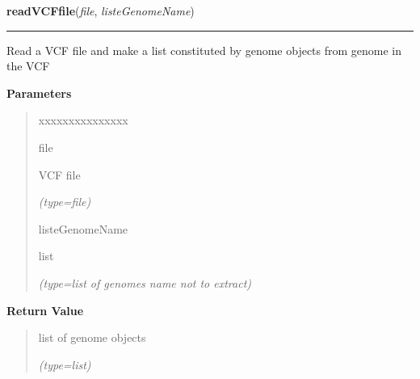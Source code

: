 \hspace{.8\funcindent}\begin{boxedminipage}{\funcwidth}

    \raggedright \textbf{readVCFfile}(\textit{file}, \textit{listeGenomeName})

    \vspace{-1.5ex}

    \rule{\textwidth}{0.5\fboxrule}
\setlength{\parskip}{2ex}
    Read a VCF file and make a list constituted by genome objects from 
    genome in the VCF

\setlength{\parskip}{1ex}
      \textbf{Parameters}
      \vspace{-1ex}

      \begin{quote}
        \begin{Ventry}{xxxxxxxxxxxxxxx}

          \item[file]

          VCF file

            {\it (type=file)}

          \item[listeGenomeName]

          list

            {\it (type=list of genomes name not to extract)}

        \end{Ventry}

      \end{quote}

      \textbf{Return Value}
    \vspace{-1ex}

      \begin{quote}
      list of genome objects

      {\it (type=list)}

      \end{quote}

    \end{boxedminipage}

    \label{script-FixedVar:selectPosSensible}

    \vspace{0.5ex}

